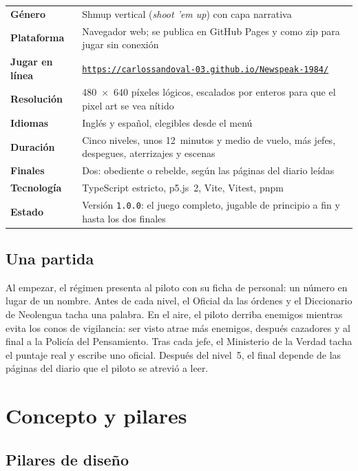 \documentclass[11pt,a4paper]{article}
\newcommand{\playurl}{https://carlossandoval-03.github.io/Newspeak-1984/}
\begin{document}
\begin{center}
\begin{tabularx}{0.92\textwidth}{>{\bfseries}l L}
  \toprule
  Género & Shmup vertical (\emph{shoot 'em up}) con capa narrativa \\
  Plataforma & Navegador web; se publica en GitHub Pages y como zip para jugar sin conexión \\
  Jugar en línea & \href{\playurl}{\color{red}\texttt{\playurl}} \\
  Resolución & 480~×~640 píxeles lógicos, escalados por enteros para que el pixel art se vea nítido \\
  Idiomas & Inglés y español, elegibles desde el menú \\
  Duración & Cinco niveles, unos 12~minutos y medio de vuelo, más jefes, despegues, aterrizajes y escenas \\
  Finales & Dos: obediente o rebelde, según las páginas del diario leídas \\
  Tecnología & TypeScript estricto, p5.js~2, Vite, Vitest, pnpm \\
  Estado & Versión \texttt{1.0.0}: el juego completo, jugable de principio a fin y hasta los dos finales \\
  \bottomrule
\end{tabularx}
\end{center}

\subsection{Una partida}

Al empezar, el régimen presenta al piloto con su ficha de personal: un número en lugar de un nombre. Antes de cada nivel, el Oficial da las órdenes y el Diccionario de Neolengua tacha una palabra. En el aire, el piloto derriba enemigos mientras evita los conos de vigilancia: ser visto atrae más enemigos, después cazadores y al final a la Policía del Pensamiento. Tras cada jefe, el Ministerio de la Verdad tacha el puntaje real y escribe uno oficial. Después del nivel~5, el final depende de las páginas del diario que el piloto se atrevió a leer.

\section{Concepto y pilares}

\subsection{Pilares de diseño}
\end{document}
